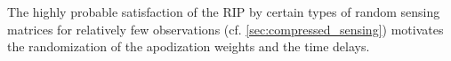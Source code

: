 The highly probable satisfaction of
the \ac{RIP} by
certain types of
random sensing matrices for
relatively few observations
(cf. \cref{sec:compressed_sensing}) motivates
the randomization of
the apodization weights and
the time delays.
